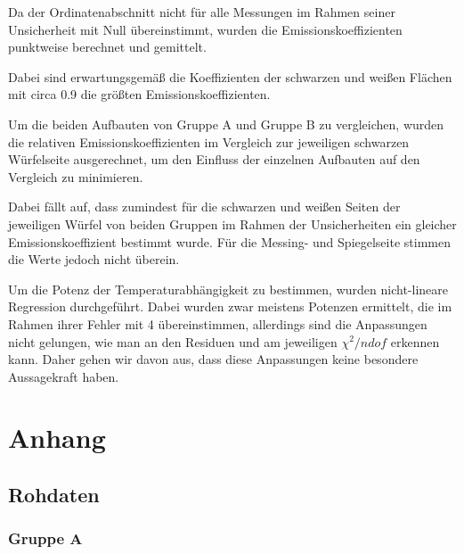 \documentclass[12pt,a4paper]{article}
\begin{document}
Da der Ordinatenabschnitt nicht für alle Messungen im Rahmen seiner Unsicherheit mit Null übereinstimmt, wurden die Emissionskoeffizienten punktweise berechnet und gemittelt.

Dabei sind erwartungsgemäß die Koeffizienten der schwarzen und weißen Flächen mit circa 0.9 die größten Emissionskoeffizienten.

Um die beiden Aufbauten von Gruppe A und Gruppe B zu vergleichen, wurden die relativen Emissionskoeffizienten im Vergleich zur jeweiligen schwarzen Würfelseite ausgerechnet, um den Einfluss der einzelnen Aufbauten auf den Vergleich zu minimieren.

Dabei fällt auf, dass zumindest für die schwarzen und weißen Seiten der jeweiligen Würfel von beiden Gruppen im Rahmen der Unsicherheiten ein gleicher Emissionskoeffizient bestimmt wurde. Für die Messing- und Spiegelseite stimmen die Werte jedoch nicht überein.


Um die Potenz der Temperaturabhängigkeit zu bestimmen, wurden nicht-lineare Regression durchgeführt. Dabei wurden zwar meistens Potenzen ermittelt, die im Rahmen ihrer Fehler mit 4 übereinstimmen, allerdings sind die Anpassungen nicht gelungen, wie man an den Residuen und am jeweiligen $\chi^2/ndof$ erkennen kann. Daher gehen wir davon aus, dass diese Anpassungen keine besondere Aussagekraft haben. 


\newpage
\section{Anhang}
\subsection{Rohdaten}
\subsubsection{Gruppe A}
\end{document}
